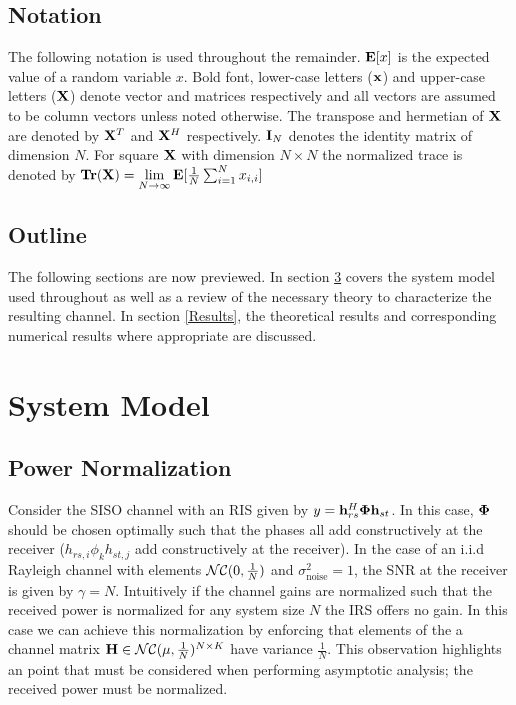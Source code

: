 \documentclass[12pt,a4paper]{report}
\begin{document}
\section{Notation}
The following notation is used throughout the remainder. 
$\mathop{\bf E{}}[x]$ is the expected value of a random variable $x$.
Bold font, lower-case letters ($\mathbf{x}$) and upper-case letters ($\mathbf{X}$) denote vector and matrices respectively and all vectors are assumed to be column vectors unless noted otherwise. 
The transpose and hermetian of $\mathbf{X}$ are denoted by $\mathbf{X}^T$ and $\mathbf{X}^H$ respectively.
$\mathbf{I}_N$ denotes the identity matrix of dimension $N$.
For square $\mathbf{X}$ with dimension $N\times N$ the normalized trace is denoted by $\mathop{\bf Tr}(\mathbf{X})  = \underset{N \rightarrow \infty}{\text{lim}}
\mathop{\bf E{}}[\frac{1}{N}\sum_{i=1}^N x_{i,i}]$

\section{Outline}
The following sections are now previewed. In section \ref{system_model} covers the system model used throughout as well as a review of the necessary theory to characterize the resulting channel. In section \ref{Results}, the theoretical results and corresponding numerical results where appropriate are discussed. 

\chapter{System Model}\label{system_model}
\section{Power Normalization}
Consider the SISO channel with an RIS given by $y = \mathbf{h}_{rs}^H \boldsymbol{\Phi} \mathbf{h}_{st}$. In this case, $ \boldsymbol{\Phi}$ should be chosen optimally such that 
the phases all add constructively at the receiver (\ie $h_{rs,i} \phi_k h_{st,j}$ add constructively at the receiver). 
In the case of an i.i.d Rayleigh channel with elements $\mathcal{NC}(0,\frac{1}{N})$ and $\sigma^2_{\text{noise}} =1$, the SNR at the receiver is given by $\gamma = N$.
Intuitively if the channel gains are normalized such that the received power is normalized for any system size $N$ the IRS offers no gain. 
In this case we can achieve this normalization by enforcing that elements of the a channel matrix $\mathbf{H} \in \mathcal{NC}(\mu,\frac{1}{N})^{N \times K}$ have variance $\frac{1}{N}$.
This observation highlights an point that must be considered when performing asymptotic analysis; the received power must be normalized.
\end{document}
